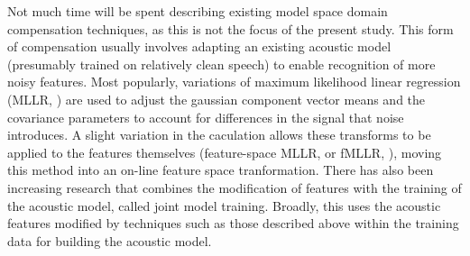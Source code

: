 \documentclass[dissertation,copyright]{uathesis}
\begin{document}
Not much time will be spent describing existing model space domain compensation techniques, as this is not the focus of the present study.  This form of compensation usually involves adapting an existing acoustic model (presumably trained on relatively clean speech) to enable recognition of more noisy features.  Most popularly, variations of maximum likelihood linear regression (MLLR, \cite{leggetter:95}) are used to adjust the gaussian component vector means and the covariance parameters to account for differences in the signal that noise introduces.  A slight variation in the caculation allows these transforms to be applied to the features themselves (feature-space MLLR, or fMLLR, \cite{gales:98}), moving this method into an on-line feature space tranformation.  There has also been increasing research that combines the modification of features with the training of the acoustic model, called joint model training.  Broadly, this uses the acoustic features modified by techniques such as those described above within the training data for building the acoustic model.



% 
% 
% 
% 
\end{document}
